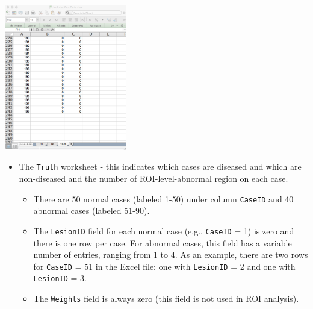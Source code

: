 \documentclass[]{book}
\providecommand{\tightlist}{%
  \setlength{\itemsep}{0pt}\setlength{\parskip}{0pt}}
\begin{document}
\includegraphics[width=0.4\textwidth,height=\textheight]{images/FROC-TP-Truth-5.png}

\begin{itemize}
\tightlist
\item
  The \texttt{Truth} worksheet - this indicates which cases are diseased and which are non-diseased and the number of ROI-level-abnormal region on each case.

  \begin{itemize}
  \tightlist
  \item
    There are 50 normal cases (labeled 1-50) under column \texttt{CaseID} and 40 abnormal cases (labeled 51-90).\\
  \item
    The \texttt{LesionID} field for each normal case (e.g., \texttt{CaseID} = 1) is zero and there is one row per case. For abnormal cases, this field has a variable number of entries, ranging from 1 to 4. As an example, there are two rows for \texttt{CaseID} = 51 in the Excel file: one with \texttt{LesionID} = 2 and one with \texttt{LesionID} = 3.\\
  \item
    The \texttt{Weights} field is always zero (this field is not used in ROI analysis).
  \end{itemize}
\end{itemize}
\end{document}
